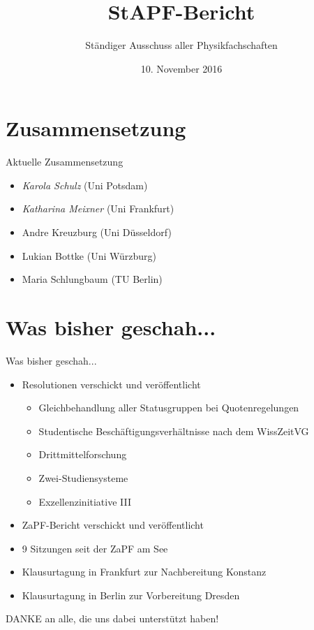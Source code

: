 \documentclass[compress, aspectratio=169]{beamer}
\title[StAPf-Bericht]{StAPF-Bericht}
\author{Ständiger Ausschuss aller Physikfachschaften}
\institute[Zusammenkunft aller Physikfachschaften]
\date{10. November 2016}
\begin{document}
\begin{frame}[plain]{}
  \titlepage
\end{frame}

\section{Zusammensetzung}

\begin{frame}{Aktuelle Zusammensetzung}
	\begin{itemize}
		\item \emph{Karola Schulz} (Uni Potsdam)
		\item \emph{Katharina Meixner} (Uni Frankfurt)
		\item Andre Kreuzburg (Uni Düsseldorf)
		\item Lukian Bottke (Uni Würzburg)
		\item Maria Schlungbaum (TU Berlin)
	\end{itemize}
\end{frame}

\section{Was bisher geschah...}

\begin{frame}{Was bisher geschah...}
	\begin{itemize}
		\item Resolutionen verschickt und veröffentlicht
			\begin{itemize}
				\item Gleichbehandlung aller Statusgruppen bei Quotenregelungen
				\item Studentische Beschäftigungsverhältnisse nach dem WissZeitVG
				\item Drittmittelforschung
				\item Zwei-Studiensysteme
				\item Exzellenzinitiative III
			\end{itemize}
	\end{itemize}
\end{frame}

\begin{frame}
	\begin{itemize}
		\item ZaPF-Bericht verschickt und veröffentlicht
		\item 9 Sitzungen seit der ZaPF am See
		\item Klausurtagung in Frankfurt zur Nachbereitung Konstanz
		\item Klausurtagung in Berlin zur Vorbereitung Dresden
	\end{itemize}
	\vspace{5mm}
	\begin{center}
		\Large DANKE an alle, die uns dabei unterstützt haben!
	\end{center}
\end{frame}
\end{document}
